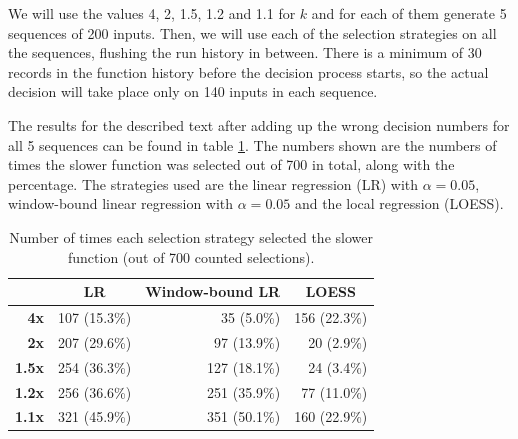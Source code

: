 We will use the values 4, 2, 1.5, 1.2 and 1.1 for $k$ and for each of them generate 5 sequences of 200 inputs. Then, we will use each of the selection strategies on all the sequences, flushing the run history in between. There is a minimum of 30 records in the function history before the decision process starts, so the actual decision will take place only on 140 inputs in each sequence.

The results for the described text after adding up the wrong decision numbers for all 5 sequences can be found in table \ref{tab:strategy_comparison}. The numbers shown are the numbers of times the slower function was selected out of 700 in total, along with the percentage. The strategies used are the linear regression (LR) with $\alpha = 0.05$, window-bound linear regression with $\alpha = 0.05$ and the local regression (LOESS).

\begin{table}[h!]
	\captionsetup{justification=centering,margin=0.5cm}
	\centering
	\bgroup
	\def\arraystretch{1.5}%
	\begin{tabular}{|r|r|r|r|}
		\hline
		\multicolumn{1}{|l|}{} & \multicolumn{1}{c|}{\textbf{LR}} & \multicolumn{1}{c|}{\textbf{Window-bound LR}} & \multicolumn{1}{c|}{\textbf{LOESS}} \\ \hline
		\textbf{4x}            & 107 (15.3\%)                     & 35 (5.0\%)                                    & 156 (22.3\%)                        \\ \hline
		\textbf{2x}            & 207 (29.6\%)                     & 97 (13.9\%)                                   & 20 (2.9\%)                          \\ \hline
		\textbf{1.5x}          & 254 (36.3\%)                     & 127 (18.1\%)                                  & 24 (3.4\%)                          \\ \hline
		\textbf{1.2x}          & 256 (36.6\%)                     & 251 (35.9\%)                                  & 77 (11.0\%)                         \\ \hline
		\textbf{1.1x}          & 321 (45.9\%)                     & 351 (50.1\%)                                  & 160 (22.9\%)                        \\ \hline
	\end{tabular}
	\egroup
	\caption{Number of times each selection strategy selected the slower function (out of 700 counted selections).}
	\label{tab:strategy_comparison}
\end{table}


